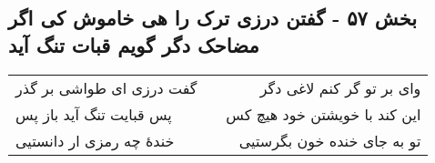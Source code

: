 \begin{center}
\section*{بخش ۵۷ - گفتن درزی ترک را هی خاموش کی اگر مضاحک دگر گویم قبات تنگ آید}
\label{sec:sh057}
\begin{longtable}{l p{0.5cm} r}
گفت درزی ای طواشی بر گذر
&&
وای بر تو گر کنم لاغی دگر
\\
پس قبایت تنگ آید باز پس
&&
این کند با خویشتن خود هیچ کس
\\
خندهٔ چه رمزی ار دانستیی
&&
تو به جای خنده خون بگرستیی
\\
\end{longtable}
\end{center}
